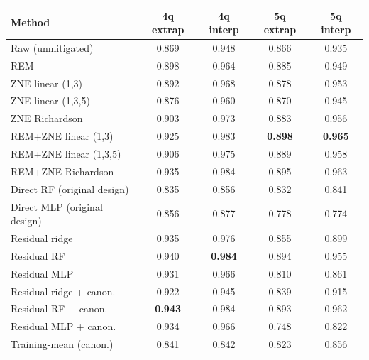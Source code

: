 \begin{tabular}{lcccc}
\toprule
Method & 4q extrap & 4q interp & 5q extrap & 5q interp \\
\midrule
Raw (unmitigated) & 0.869 & 0.948 & 0.866 & 0.935 \\
REM & 0.898 & 0.964 & 0.885 & 0.949 \\
ZNE linear (1,3) & 0.892 & 0.968 & 0.878 & 0.953 \\
ZNE linear (1,3,5) & 0.876 & 0.960 & 0.870 & 0.945 \\
ZNE Richardson & 0.903 & 0.973 & 0.883 & 0.956 \\
REM+ZNE linear (1,3) & 0.925 & 0.983 & \textbf{0.898} & \textbf{0.965} \\
REM+ZNE linear (1,3,5) & 0.906 & 0.975 & 0.889 & 0.958 \\
REM+ZNE Richardson & 0.935 & 0.984 & 0.895 & 0.963 \\
\midrule

Direct RF (original design) & 0.835 & 0.856 & 0.832 & 0.841 \\
Direct MLP (original design) & 0.856 & 0.877 & 0.778 & 0.774 \\
Residual ridge & 0.935 & 0.976 & 0.855 & 0.899 \\
Residual RF & 0.940 & \textbf{0.984} & 0.894 & 0.955 \\
Residual MLP & 0.931 & 0.966 & 0.810 & 0.861 \\
Residual ridge + canon. & 0.922 & 0.945 & 0.839 & 0.915 \\
Residual RF + canon. & \textbf{0.943} & 0.984 & 0.893 & 0.962 \\
Residual MLP + canon. & 0.934 & 0.966 & 0.748 & 0.822 \\
Training-mean (canon.) & 0.841 & 0.842 & 0.823 & 0.856 \\
\midrule

\bottomrule
\end{tabular}